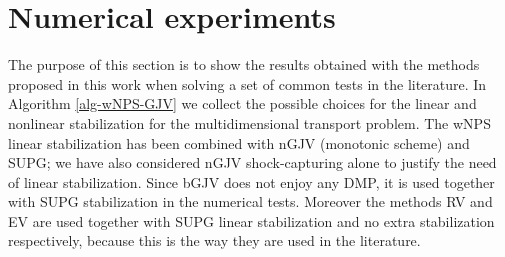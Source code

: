 

\section{Numerical experiments}\label{s-numex}
%
The purpose of this section is to show the results obtained with the methods proposed in this work when solving a set of common tests in the literature. In Algorithm \ref{alg-wNPS-GJV}  we collect the possible choices for the linear and nonlinear stabilization for the multidimensional transport problem. The wNPS linear stabilization has been combined with nGJV (monotonic scheme) and SUPG; we have also considered nGJV shock-capturing alone to justify the need of linear stabilization. Since bGJV does not enjoy any DMP, it is used together with SUPG stabilization in the numerical tests. Moreover the methods RV and EV are used together with SUPG linear stabilization and no extra stabilization respectively, because this is the way they are used in the literature. 


